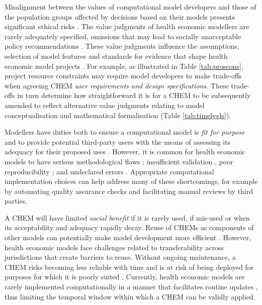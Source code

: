 \documentclass[sn-vancouver,Numbered,pdflatex]{sn-jnl}
\theoremstyle{remark}
\theoremstyle{definition}
\begin{document}
Misalignment between the values of computational model developers and those of the population groups affected by decisions based on their models presents significant ethical risks \citep{thompson2022escape, duckett2022journey}. The value judgments of health economic modellers are rarely adequately specified, omissions that may lead to socially unacceptable policy recommendations \citep{duckett2022journey}. These value judgments influence the assumptions, selection of model features and standards for evidence that shape health economic model projects \citep{HARVARD2020112975}. For example, as illustrated in Table \ref{tab:proscons}, project resource constraints may require model developers to make trade-offs when agreeing CHEM \emph{user requirements and design specifications}. These trade-offs in turn determine how straightforward it is for a CHEM to be subsequently amended to reflect alternative value judgments relating to model conceptualisation and mathematical formalisation (Table \ref{tab:timelygls}).

Modellers have duties both to ensure a computational model is \emph{fit for purpose} and to provide potential third-party users with the means of assessing its adequacy for their proposed uses \citep{Erdemir2020, Feenstra2022, thompson2019escape, 10.3389/fpubh.2017.00068}. However, it is common for health economic models to have serious methodological flaws \citep{carletto_zanuzzi_sammarco_russo_2020, WONDER2015467}; insufficient validation \citep{Ghabri2019, kolovos2017model, haji2013model}, poor reproducibility \citep{Jalali2021, McManus2019, Bermejo2017}; and undeclared errors \citep{Radeva2020}. Appropriate computational implementation choices can help address many of these shortcomings, for example by automating quality assurance checks and facilitating manual reviews by third parties.

A CHEM will have limited \emph{social benefit} if it is rarely used, if mis-used or when its acceptability and adequacy rapidly decay. Reuse of CHEMs as components of other models can potentially make model development more efficient \citep{Arnold2010, garcia2021cost}. However, health economic models face challenges related to transferability across jurisdictions \citep{garcia2021cost} that create barriers to reuse. Without ongoing maintenance, a CHEM risks becoming less reliable with time \citep{garcia2021cost} and is at risk of being deployed for purposes for which it is poorly suited \citep{calder2018computational}. Currently, health economic models are rarely implemented computationally in a manner that facilitates routine updates \citep{Sampson2017}, thus limiting the temporal window within which a CHEM can be validly applied.
\end{document}
